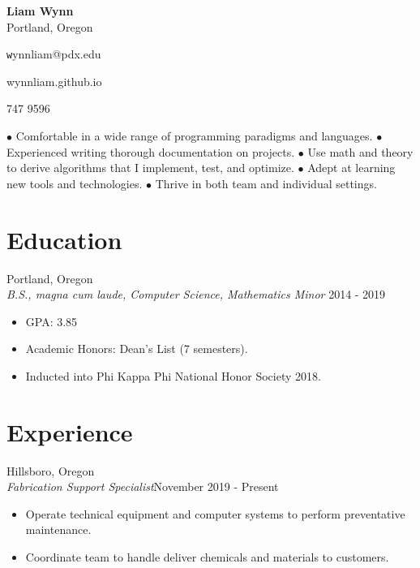 \documentclass[12pt]{article}
\newcommand\textline[4][t]{%
  \par\smallskip\noindent\parbox[#1]{.333\textwidth}{\raggedright\texttt#2}%
  \parbox[#1]{.333\textwidth}{\centering#3}%
  \parbox[#1]{.333\textwidth}{\raggedleft#4}\par\smallskip%
}
\begin{document}
	\begin{center}
		\noindent \Large{\textbf{Liam Wynn}}\\
		\noindent \small{Portland, Oregon}
	\end{center}

	\begin{flushleft}
	\textline[t]{wynnliam@pdx.edu}{wynnliam.github.io}{503 747 9596}
	\noindent\makebox[\linewidth]{\rule{\textwidth}{0.4pt}}
	\end{flushleft}

	 $\bullet$ Comfortable in a wide range of programming paradigms and languages. $\bullet$ Experienced writing thorough documentation on projects.  $\bullet$ Use math and theory to derive algorithms that I implement, test, and optimize. $\bullet$ Adept at learning new tools and technologies. $\bullet$ Thrive in both team and individual settings.

	\section*{Education}
	\hfill Portland, Oregon \\
 	\noindent \emph {B.S., magna cum laude, Computer Science, Mathematics Minor} \hfill 2014 - 2019
	\begin{itemize}[noitemsep]
		\item GPA: 3.85
		\item Academic Honors: Dean's List (7 semesters).
		\item Inducted into Phi Kappa Phi National Honor Society 2018.
	\end{itemize}

	\section*{Experience}
	\hfill Hillsboro, Oregon\\
	\noindent \emph{Fabrication Support Specialist}\hfill November 2019 - Present
	\begin{itemize}[noitemsep]
		\item Operate technical equipment and computer systems to perform preventative maintenance.
		\item Coordinate team to handle deliver chemicals and materials to customers.
	\end{itemize}
\end{document}
